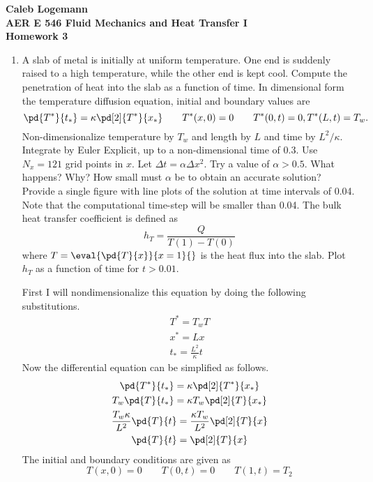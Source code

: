 \documentclass[11pt, oneside]{article}
\begin{document}
\noindent \textbf{\Large{Caleb Logemann \\
AER E 546 Fluid Mechanics and Heat Transfer I \\
Homework 3
}}

%
\begin{enumerate}
  \item %
    A slab of metal is initially at uniform temperature.
    One end is suddenly raised to a high temperature, while the other end is kept cool.
    Compute the penetration of heat into the slab as a function of time.
    In dimensional form the temperature diffusion equation, initial and boundary values are
    \[
      \pd{T^*}{t_*} = \kappa \pd[2]{T^*}{x_*} \qquad T^*(x,0) = 0 \qquad T^*(0, t) = 0, T^*(L, t) = T_w.
    \]
    Non-dimensionalize temperature by $T_w$ and length by $L$ and time by $L^2/\kappa$.
    Integrate by Euler Explicit, up to a non-dimensional time of $0.3$.
    Use $N_x = 121$ grid points in $x$.
    Let $\Delta t = \alpha \Delta x^2$.
    Try a value of $\alpha > 0.5$.
    What happens?
    Why?
    How small must $\alpha$ be to obtain an accurate solution?
    Provide a single figure with line plots of the solution at time intervals of 0.04.
    Note that the computational time-step will be smaller than 0.04.
    The bulk heat transfer coefficient is defined as
    \[
      h_T = \frac{Q}{T(1) - T(0)}
    \]
    where $T = \eval{\pd{T}{x}}{x = 1}{}$ is the heat flux into the slab.
    Plot $h_T$ as a function of time for $t > 0.01$.

    First I will nondimensionalize this equation by doing the following substitutions.
    \begin{gather}
      T^* = T_w T \\
      x^* = L x \\
      t_* = \frac{L^2}{\kappa} t
    \end{gather}
    Now the differential equation can be simplified as follows.
    \begin{gather}
      \pd{T^*}{t_*} = \kappa \pd[2]{T^*}{x_*} \\
      T_w \pd{T}{t_*} = \kappa T_w \pd[2]{T}{x_*} \\
      \frac{T_w \kappa}{L^2} \pd{T}{t} = \frac{\kappa T_w}{L^2} \pd[2]{T}{x} \\
      \pd{T}{t} = \pd[2]{T}{x}
    \end{gather}
    The initial and boundary conditions are given as
    \[
      T(x, 0) = 0 \qquad T(0, t) = 0 \qquad T(1, t) = T_2
    \]


\end{enumerate}
\end{document}
